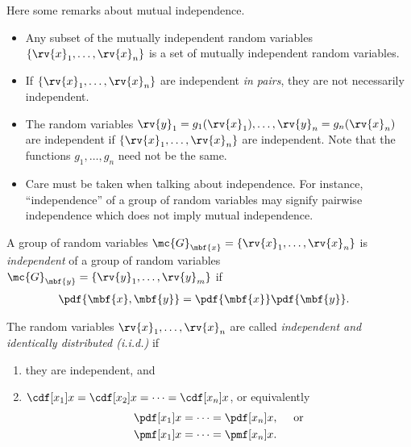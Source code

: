 \begin{remark}
    Here some remarks about mutual independence.
    \begin{itemize}
        \item Any subset of the mutually independent random variables $\left\{ \rv{x}_{1}, \ldots, \rv{x}_{n}\right\}$ is a set of mutually independent random variables. 
        \item If $\left\{ \rv{x}_{1},\ldots, \rv{x}_{n}\right\}$ are independent \emph{in pairs}, they are not necessarily independent.
        \item The random variables $\rv{y}_{1}=g_{1}(\rv{x}_{1}),\ldots,\rv{y}_{n}=g_{n}(\rv{x}_{n})$ are independent if $\left\{ \rv{x}_{1},\ldots, \rv{x}_{n}\right\}$ are independent. Note that the functions $g_{1}, \ldots, g_{n}$ need not be the same.
        \item Care must be taken when talking about independence. For instance, ``independence'' of a group of random variables may signify pairwise independence which does not imply mutual independence.
    \end{itemize}
\end{remark}

\begin{definitionBox}
    A group of random variables $\mc{G}_{\mbf{x}} = \left\{ \rv{x}_{1}, \ldots,\rv{x}_{n}\right\}$ is \emph{independent} of a group of random variables $\mc{G}_{\mbf{y}} = \left\{ \rv{y}_{1}, \ldots,\rv{y}_{m}\right\}$ if 
    \begin{align}
        \pdf{\mbf{x},\mbf{y}} &= \pdf{\mbf{x}}\pdf{\mbf{y}}.
    \end{align}
\end{definitionBox}

\begin{definitionBox}
    The random variables $\rv{x}_{1}, \ldots, \rv{x}_{n}$ are called \emph{independent and identically distributed (i.i.d.)} if 
    \begin{enumerate}
        \item they are independent, and
        \item $\cdf[x_{1}]{x} = \cdf[x_{2}]{x} = \cdots = \cdf[x_{n}]{x}$, or equivalently
        \begin{align}
            \pdf[x_{1}]{x} &= \cdots = \pdf[x_{n}]{x}, \quad \text{ or}\\
            \pmf[x_{1}]{x} &= \cdots = \pmf[x_{n}]{x}.           
        \end{align}
    \end{enumerate}
\end{definitionBox}

